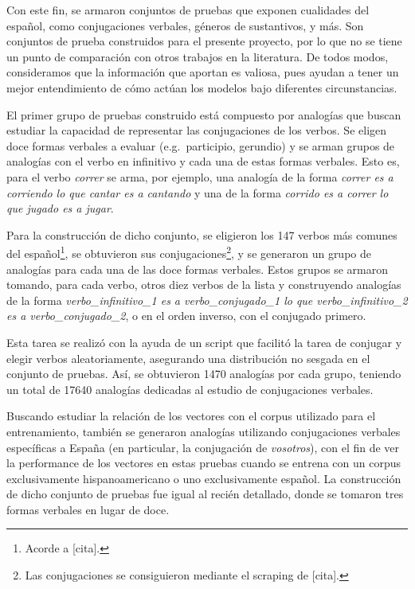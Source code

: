 Con este fin, se armaron conjuntos de pruebas que exponen cualidades del español, como conjugaciones
verbales, géneros de sustantivos, y más. Son conjuntos de prueba construidos para el presente
proyecto, por lo que no se tiene un punto de comparación con otros trabajos en la literatura. De
todos modos, consideramos que la información que aportan es valiosa, pues ayudan a tener un mejor
entendimiento de cómo actúan los modelos bajo diferentes circunstancias.


El primer grupo de pruebas construido está compuesto por analogías que buscan estudiar la capacidad
de representar las conjugaciones de los verbos. Se eligen doce formas verbales a evaluar
(e.g.\ participio, gerundio) y se arman grupos de analogías con el verbo en infinitivo y cada una de
estas formas verbales. Esto es, para el verbo \textit{correr} se arma, por ejemplo, una analogía de
la forma \textit{correr es a corriendo lo que cantar es a cantando} y una de la forma
\textit{corrido es a correr lo que jugado es a jugar}.

Para la construcción de dicho conjunto, se eligieron los 147 verbos más comunes del
español\footnote{Acorde a [cita].}, se obtuvieron sus conjugaciones\footnote{Las conjugaciones se
consiguieron mediante el scraping de [cita].}, y se generaron un grupo de analogías para cada una de
las doce formas verbales. Estos grupos se armaron tomando, para cada verbo, otros diez verbos de la
lista y construyendo analogías de la forma \textit{verbo\_infinitivo\_1 es a verbo\_conjugado\_1 lo
que verbo\_infinitivo\_2 es a verbo\_conjugado\_2}, o en el orden inverso, con el conjugado primero.

Esta tarea se realizó con la ayuda de un script que facilitó la tarea de conjugar y elegir verbos
aleatoriamente, asegurando una distribución no sesgada en el conjunto de pruebas. Así, se obtuvieron
1470 analogías por cada grupo, teniendo un total de 17640 analogías dedicadas al estudio de
conjugaciones verbales.


Buscando estudiar la relación de los vectores con el corpus utilizado para el entrenamiento, también
se generaron analogías utilizando conjugaciones verbales específicas a España (en particular, la
conjugación de \textit{vosotros}), con el fin de ver la performance de los vectores en estas pruebas
cuando se entrena con un corpus exclusivamente hispanoamericano o uno exclusivamente español. La
construcción de dicho conjunto de pruebas fue igual al recién detallado, donde se tomaron tres
formas verbales en lugar de doce.


